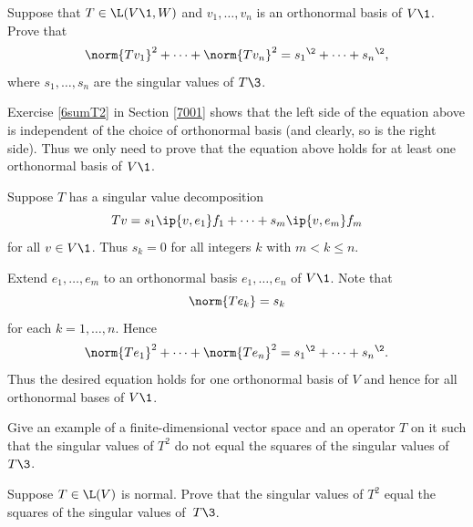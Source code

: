 \exercise
Suppose that $T \in \L(V\1, W)$ and $v_1, \ldots, v_n$ is an orthonormal basis of $V\1$. Prove that \label{4sums2}
\[
\norm{Tv_1}^2 + \cdots + \norm{Tv_n}^2 = {s_1}^{\2} + \cdots + {s_n}^{\2},
\]
where $s_1, \ldots, s_n$ are the singular values of $T\3$.

\begin{Solution}
Exercise \ref{6sumT2} in Section \ref{7001} shows that the left side of the equation above is independent of the choice of orthonormal basis (and clearly, so is the right side). Thus we only need to prove that the equation above holds for at least one orthonormal basis of $V\1$.

Suppose $T$ has a singular value decomposition
\[
Tv = s_1 \ip{v, e_1} f_1 + \cdots + s_m \ip{v, e_m} f_m
\]
for all $v \in V\1$. Thus $s_k = 0$ for all integers $k$ with $m < k \le n$.

Extend $e_1, \ldots, e_m$ to an orthonormal basis $e_1, \ldots, e_n$ of $V\1$. Note that
\[
\norm{Te_k} = s_k
\]
for each $k = 1, \ldots, n$. Hence
\[
\norm{Te_1}^2 + \cdots + \norm{Te_n}^2 = {s_1}^{\2} + \cdots + {s_n}^{\2}.
\]
Thus the desired equation holds for one orthonormal basis of $V$ and hence for all orthonormal bases of $V\1$.
\end{Solution}

\exercise
\begin{subtheorem}
\item
Give an example of a finite-dimensional vector space and an operator $T$ on it
such that the singular values of $T^2$ do not equal the squares of the singular values of~$T\3$.
\item
Suppose $T \in \L(V)$ is normal. Prove that the singular values of $T^2$ equal the squares of the singular values of~$T\3$.
\end{subtheorem}

